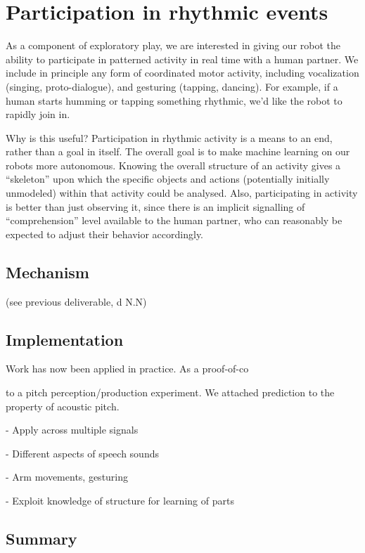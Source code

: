 
\section{Participation in rhythmic events}

As a component of exploratory play, we are interested in giving our
robot the ability to participate in patterned activity in real time
with a human partner.  We include in principle any form of
coordinated motor activity, including vocalization
(singing, proto-dialogue), and gesturing (tapping, dancing).
%
For example, if a human starts humming or tapping something rhythmic, 
we'd like the robot to rapidly join in.

Why is this useful?  Participation in rhythmic activity is a means to
an end, rather than a goal in itself.  The overall goal is to make
machine learning on our robots more autonomous.
%
Knowing the overall structure of an activity gives a ``skeleton'' upon
which the specific objects and actions (potentially initially
unmodeled) within that activity could be analysed.
%
Also, participating in activity is better than just observing it,
since there is an implicit signalling of ``comprehension'' level
available to the human partner, who can reasonably be expected to
adjust their behavior accordingly.


\subsection{Mechanism}

(see previous deliverable, d N.N)


\subsection{Implementation}

Work has now been applied in practice.
As a proof-of-co

 to a pitch
perception/production experiment.  We attached prediction to the
property of acoustic pitch.


- Apply across multiple signals

- Different aspects of speech sounds

- Arm movements, gesturing

- Exploit knowledge of structure for learning of parts


\subsection{Summary}

